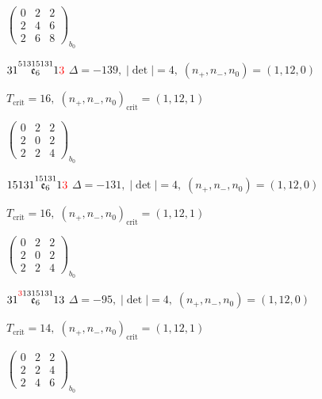 \documentclass[10pt]{article}
\begin{document}
\hspace{2em}$\left(\begin{smallmatrix}0 & 2 & 2 \\ 2 & 4 & 6 \\ 2 & 6 & 8\end{smallmatrix}\right)_{\!b_0}$

\smallskip

$31\overset{51315131}{\mathfrak{e}_6}1\textcolor{red}{3}$ \quad $\Delta=-139,\; |\det|=4,\; (n_+,n_-,n_0)=(1,12,0)$

\hspace{1em}$T_{\text{crit}}=16,\; (n_+,n_-,n_0)_{\text{crit}}=(1,12,1)$

\hspace{2em}$\left(\begin{smallmatrix}0 & 2 & 2 \\ 2 & 0 & 2 \\ 2 & 2 & 4\end{smallmatrix}\right)_{\!b_0}$

\smallskip

$15131\overset{15131}{\mathfrak{e}_6}1\textcolor{red}{3}$ \quad $\Delta=-131,\; |\det|=4,\; (n_+,n_-,n_0)=(1,12,0)$

\hspace{1em}$T_{\text{crit}}=16,\; (n_+,n_-,n_0)_{\text{crit}}=(1,12,1)$

\hspace{2em}$\left(\begin{smallmatrix}0 & 2 & 2 \\ 2 & 0 & 2 \\ 2 & 2 & 4\end{smallmatrix}\right)_{\!b_0}$

\smallskip

$31\overset{\textcolor{red}{3}1315131}{\mathfrak{e}_6}13$ \quad $\Delta=-95,\; |\det|=4,\; (n_+,n_-,n_0)=(1,12,0)$

\hspace{1em}$T_{\text{crit}}=14,\; (n_+,n_-,n_0)_{\text{crit}}=(1,12,1)$

\hspace{2em}$\left(\begin{smallmatrix}0 & 2 & 2 \\ 2 & 2 & 4 \\ 2 & 4 & 6\end{smallmatrix}\right)_{\!b_0}$
\end{document}
